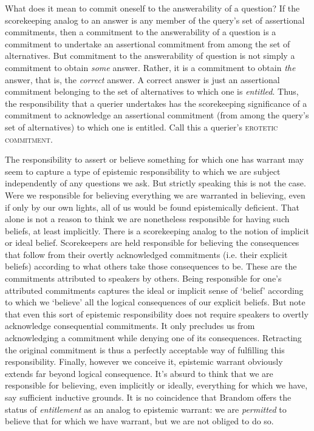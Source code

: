 \documentclass{article}                     %
\begin{document}
What does it mean to commit oneself to the answerability of a question?
If the scorekeeping analog to an answer is any member of the query's
set of assertional commitments, then a commitment to the answerability
of a question is a commitment to undertake an assertional commitment
from among the set of alternatives. But commitment to the answerability
of question is not simply a commitment to obtain \emph{some} answer.
Rather, it is a commitment to obtain \emph{the} answer, that is, the
\emph{correct} answer. A correct answer is just an assertional commitment
belonging to the set of alternatives to which one is \emph{entitled}.
Thus, the responsibility that a querier undertakes has the scorekeeping
significance of a commitment to acknowledge an assertional commitment
(from among the query's set of alternatives) to which one is entitled.
Call this a querier's \textsc{erotetic commitment}.

The responsibility to assert or believe something for which one has
warrant may seem to capture a type of epistemic responsibility to
which we are subject independently of any questions we ask. But strictly
speaking this is not the case. Were we responsible for believing everything
we are warranted in believing, even if only by our own lights, all
of us would be found epistemically deficient. That alone is not a
reason to think we are nonetheless responsible for having such beliefs,
at least implicitly. There is a scorekeeping analog to the notion
of implicit or ideal belief. Scorekeepers are held responsible for
believing the consequences that follow from their overtly acknowledged
commitments (i.e. their explicit beliefs) according to what others
take those consequences to be. These are the commitments attributed
to speakers by others. Being responsible for one's attributed commitments
captures the ideal or implicit sense of `belief' according to which
we `believe' all the logical consequences of our explicit beliefs.
But note that even this sort of epistemic responsibility does not
require speakers to overtly acknowledge consequential commitments.
It only precludes us from acknowledging a commitment while denying
one of its consequences. Retracting the original commitment is thus
a perfectly acceptable way of fulfilling this responsibility. Finally,
however we conceive it, epistemic warrant obviously extends far beyond
logical consequence. It's absurd to think that we are responsible
for believing, even implicitly or ideally, everything for which we
have, say sufficient inductive grounds. It is no coincidence that
Brandom offers the status of \emph{entitlement} as an analog to epistemic
warrant: we are \emph{permitted} to believe that for which we have
warrant, but we are not obliged to do so.
\end{document}
